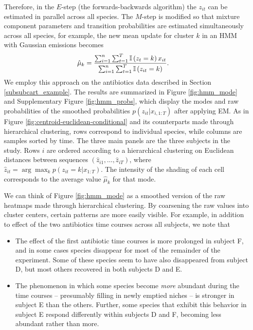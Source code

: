 Therefore, in the $E$-step (the forwards-backwards algorithm) the $z_{it}$ can
be estimated in parallel across all species. The $M$-step is modified so that
mixture component parameters and transition probabilities are estimated
simultaneously across all species, for example, the new mean update for cluster
$k$ in an HMM with Gaussian emissions becomes
\begin{align*}
\hat{\mu}_{k} &= \frac{\sum_{i = 1}^{n}\sum_{t = 1}^{T} \mathbb{I}\left({z_{t} = k}\right)x_{it}}{\sum_{i = 1}^{n}\sum_{t = 1}^{T} \mathbb{I}\left({z_{it} = k}\right)}.
\end{align*}
We employ this approach on the antibiotics data described in Section
\ref{subsubcart_example}. The results are summarized in Figure
\ref{fig:hmm_mode} and Supplementary Figure \ref{fig:hmm_probs}, which display
the modes and raw probabilities of the smoothed probabilities $p\left(z_{it}
\vert x_{i, 1:T}\right)$ after applying EM. As in Figure
\ref{fig:centroid-euclidean-conditional} and its counterparts made through
hierarchical clustering, rows correspond to individual species, while columns
are samples sorted by time. The three main panels are the three subjects in the
study. Rows $i$ are ordered according to a hierarchical clustering on Euclidean
distances between sequences $\left(\hat{z}_{i1}, \dots, \hat{z}_{iT}\right)$,
where $\hat{z}_{it} = \arg \max_{k} p\left(z_{it} = k \vert x_{1:T}\right)$. The
intensity of the shading of each cell corresponds to the average value
$\hat{\mu}_{k}$ for that mode.

We can think of Figure \ref{fig:hmm_mode} as a smoothed version of the raw
heatmaps made through hierarchical clustering. By coarsening the raw values into
cluster centers, certain patterns are more easily visible. For example, in
addition to effect of the two antibiotics time courses across all subjects, we
note that

\begin{itemize}
\item The effect of the first antibiotic time courses is more prolonged in
  subject F, and in some cases species disappear for most of the remainder of
  the experiment. Some of these species seem to have also disappeared from
  subject D, but most others recovered in both subjects D and E.
\item The phenomenon in which some species become \textit{more} abundant during
  the time courses -- presumably filling in newly emptied niches -- is stronger
  in subject E than the others. Further, some species that exhibit this behavior
  in subject E respond differently within subjects D and F, becoming less
  abundant rather than more.
\end{itemize}

